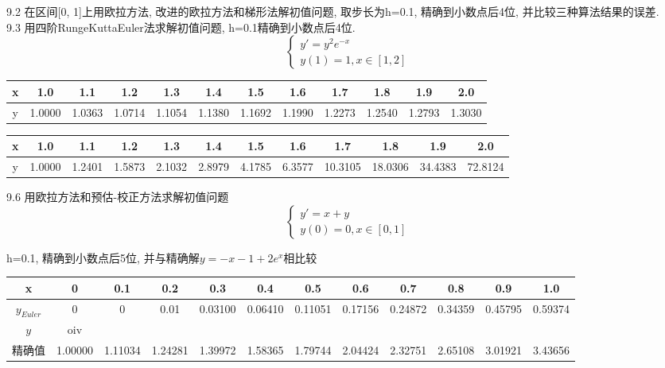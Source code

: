 \documentclass[a4paper, 10pt]{article}
\begin{document}
\begin{CJK}{UTF8}{gbsn}
9.2
在区间[0, 1]上用欧拉方法, 改进的欧拉方法和梯形法解初值问题, 取步长为h=0.1, 精确到小数点后4位, 并比较三种算法结果的误差. \\

9.3
用四阶RungeKuttaEuler法求解初值问题, h=0.1精确到小数点后4位. \\
\begin{equation*}
	\begin{cases}
		y' = y^{2}e^{-x} \\
		y(1) = 1, x\in[1,2]
	\end{cases}
\end{equation*}


\begin{tabular}{c|c c c c c c c c c c c}
\hline
 x & 1.0 & 1.1 & 1.2 & 1.3 & 1.4 & 1.5 & 1.6 & 1.7 & 1.8 & 1.9 & 2.0 \\
 \hline
 y & 1.0000 & 1.0363 & 1.0714 & 1.1054 & 1.1380 & 1.1692 & 1.1990 & 1.2273 & 1.2540 & 1.2793 & 1.3030 \\
 \hline
\end{tabular}


\begin{tabular}{c|c c c c c c c c c c c}
\hline
 x & 1.0 & 1.1 & 1.2 & 1.3 & 1.4 & 1.5 & 1.6 & 1.7 & 1.8 & 1.9 & 2.0 \\
\hline
y & 1.0000 & 1.2401 & 1.5873 & 2.1032 & 2.8979 & 4.1785 & 6.3577 & 10.3105 & 18.0306 & 34.4383 & 72.8124 \\
\hline
\end{tabular}

9.6
用欧拉方法和预估-校正方法求解初值问题
\begin{equation}
	\begin{cases}
		y' = x+y \\
		y(0) = 0, x\in[0,1]
	\end{cases}
\end{equation}

h=0.1, 精确到小数点后5位, 并与精确解$y=-x-1+2e^x$相比较

\begin{tabular}{c|c c c c c c c c c c c}
\hline
x & 0 & 0.1 & 0.2 & 0.3 & 0.4 & 0.5 & 0.6 & 0.7 & 0.8 & 0.9 & 1.0 \\
\hline
$y_{Euler}$ & 0 & 0 & 0.01 & 0.03100 & 0.06410 & 0.11051 & 0.17156 & 0.24872 & 0.34359 & 0.45795 & 0.59374 \\
$y_{}$ & oiv \\
\hline
精确值 & 1.00000 & 1.11034 & 1.24281 & 1.39972 & 1.58365 & 1.79744 & 2.04424 & 2.32751 & 2.65108 & 3.01921 & 3.43656 \\
\hline

\end{tabular}
\end{CJK}
\end{document}
